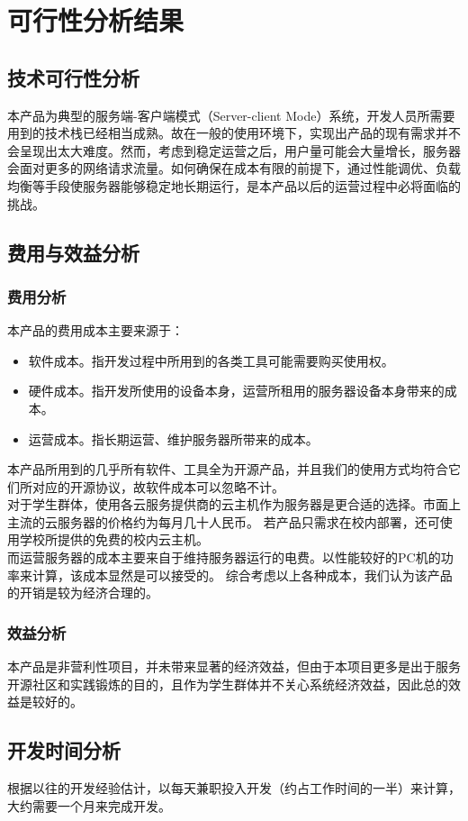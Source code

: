 \chapter{可行性分析结果}

\section{技术可行性分析}
本产品为典型的服务端-客户端模式（Server-client Mode）系统，开发人员所需要用到的技术栈已经相当成熟。故在一般的使用环境下，实现出产品的现有需求并不会呈现出太大难度。然而，考虑到稳定运营之后，用户量可能会大量增长，服务器会面对更多的网络请求流量。如何确保在成本有限的前提下，通过性能调优、负载均衡等手段使服务器能够稳定地长期运行，是本产品以后的运营过程中必将面临的挑战。
\section{费用与效益分析}
\subsection{费用分析}
本产品的费用成本主要来源于：
\begin{itemize}
    \item 软件成本。指开发过程中所用到的各类工具可能需要购买使用权。
    \item 硬件成本。指开发所使用的设备本身，运营所租用的服务器设备本身带来的成本。
    \item 运营成本。指长期运营、维护服务器所带来的成本。
\end{itemize}

本产品所用到的几乎所有软件、工具全为开源产品，并且我们的使用方式均符合它们所对应的开源协议，故软件成本可以忽略不计。\\

对于学生群体，使用各云服务提供商的云主机作为服务器是更合适的选择。市面上主流的云服务器的价格约为每月几十人民币。
若产品只需求在校内部署，还可使用学校所提供的免费的校内云主机。\\

而运营服务器的成本主要来自于维持服务器运行的电费。以性能较好的PC机的功率来计算，该成本显然是可以接受的。
综合考虑以上各种成本，我们认为该产品的开销是较为经济合理的。
\subsection{效益分析}
本产品是非营利性项目，并未带来显著的经济效益，但由于本项目更多是出于服务开源社区和实践锻炼的目的，且作为学生群体并不关心系统经济效益，因此总的效益是较好的。
\section{开发时间分析}
根据以往的开发经验估计，以每天兼职投入开发（约占工作时间的一半）来计算，大约需要一个月来完成开发。